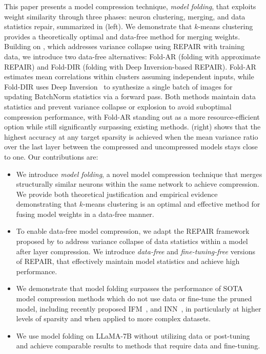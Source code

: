\documentclass{article}
\begin{document}
This paper presents a model compression technique, \emph{model folding}, that exploits weight similarity through three phases: neuron clustering, merging, and data statistics repair, summarized in  (left). We demonstrate that $k$-means clustering provides a theoretically optimal and data-free method for merging weights. Building on \citet{jordan2022repair}, which addresses variance collapse using REPAIR with training data, we introduce two data-free alternatives: Fold-AR (folding with approximate REPAIR) and Fold-DIR (folding with Deep Inversion-based REPAIR). Fold-AR estimates mean correlations within clusters assuming independent inputs, while Fold-DIR uses Deep Inversion~\citep{yin2020dreamingdistilldatafreeknowledge} to synthesize a single batch of images for updating BatchNorm statistics via a forward pass. Both methods maintain data statistics and prevent variance collapse or explosion to avoid suboptimal compression performance, with Fold-AR standing out as a more resource-efficient option while still significantly surpassing existing methods.  (right) shows that the highest accuracy at any target sparsity is achieved when the mean variance ratio over the last layer
between the compressed and uncompressed models stays close to one.
Our contributions are: 
\begin{itemize}
     \item We introduce \emph{model folding}, a novel model compression technique that merges structurally similar neurons within the same network to achieve compression. We provide both theoretical justification and empirical evidence demonstrating that $k$-means clustering is an optimal and effective method for fusing model weights in a data-free manner. 
     \item To enable data-free model compression, we adapt the REPAIR framework proposed by \citet{jordan2022repair} to address variance collapse of data statistics within a model after layer compression. We introduce \emph{data-free} and \emph{fine-tuning-free} versions of REPAIR, that effectively maintain model statistics and achieve high performance. 
     \item We demonstrate that model folding surpasses the performance of SOTA model compression methods which do not use data or fine-tune the pruned model, including recently proposed IFM~\citep{chen2023going}, and INN~\citep{Solodskikh_2023_CVPR}, in particularly at higher levels of sparsity and when applied to more complex datasets. 
     \item We use model folding on LLaMA-7B without utilizing data or post-tuning and achieve comparable results to methods that require data and fine-tuning.
\end{itemize}
\end{document}
